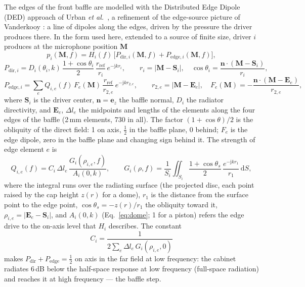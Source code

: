 \documentclass[11pt,a4paper]{article}
\newcommand{\vect}[1]{\mathbf{#1}}
\newcommand{\dd}{\,\mathrm{d}}
\newcommand{\jj}{\mathrm{j}}
\begin{document}
The edges of the front baffle are modelled with the Distributed Edge Dipole (DED) approach of
Urban \emph{et al.}\ \cite{urban2004}, a refinement of the edge-source picture of
Vanderkooy \cite{vanderkooy1991}: a line of dipoles along the edges, driven by the pressure
the driver produces there. In the form used here, extended to a source of finite size, driver $i$
produces at the microphone position $\vect M$
\begin{equation}
  p_i(\vect M,f)=H_i(f)\,\big[P_{\text{dir},i}(\vect M,f)+P_{\text{edge},i}(\vect M,f)\big],
  \label{eq:ded}
\end{equation}
\begin{equation}
  P_{\text{dir},i}=D_i(\theta_i,k)\,\frac{1+\cos\theta_i}{2}\,\frac{r_\text{ref}}{r_i}\,e^{-\jj kr_i},\qquad
  r_i=|\vect M-\vect S_i|,\quad \cos\theta_i=\frac{\vect n\cdot(\vect M-\vect S_i)}{r_i},
\end{equation}
\begin{equation}
  P_{\text{edge},i}=\sum_e Q_{i,e}(f)\,F_e(\vect M)\,\frac{r_\text{ref}}{r_{2,e}}\,e^{-\jj kr_{2,e}},\qquad
  r_{2,e}=|\vect M-\vect E_e|,\quad F_e(\vect M)=-\frac{\vect n\cdot(\vect M-\vect E_e)}{r_{2,e}},
\end{equation}
where $\vect S_i$ is the driver center, $\vect n=\vect e_z$ the baffle normal, $D_i$ the radiator
directivity, and $\vect E_e$, $\Delta l_e$ the midpoints and lengths of the elements along the four
edges of the baffle (2\,mm elements, 730 in all). The factor $(1+\cos\theta)/2$ is the obliquity
of the direct field: 1 on axis, $\tfrac12$ in the baffle plane, 0 behind; $F_e$ is the edge dipole,
zero in the baffle plane and changing sign behind it. The strength of edge element $e$ is
\begin{equation}
  Q_{i,e}(f)=C_i\,\Delta l_e\,\frac{G_i(\rho_{i,e},f)}{A_i(0,k)},\qquad
  G_i(\rho,f)=\frac{1}{S_i}\iint_{S_i}\frac{1+\cos\theta_s}{2}\,\frac{e^{-\jj kr_1}}{r_1}\dd S,
  \label{eq:edge}
\end{equation}
where the integral runs over the radiating surface (the projected disc, each point raised by the
cap height $z(r)$ for a dome), $r_1$ is the distance from the surface point to the edge point,
$\cos\theta_s=-z(r)/r_1$ the obliquity toward it, $\rho_{i,e}=|\vect E_e-\vect S_i|$, and $A_i(0,k)$
(Eq.~\ref{eq:dome}; 1 for a piston) refers the edge drive to the on-axis level that $H_i$
describes. The constant
\begin{equation}
  C_i=\frac{1}{2\sum_e\Delta l_e\,G_i(\rho_{i,e},0)}
\end{equation}
makes $P_\text{dir}+P_\text{edge}=\tfrac12$ on axis in the far field at low frequency: the cabinet
radiates 6\,dB below the half-space response at low frequency (full-space radiation) and reaches it
at high frequency --- the baffle step.
\end{document}
